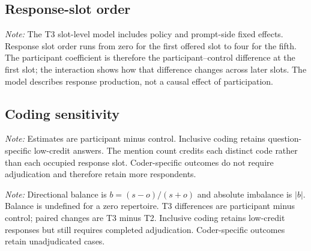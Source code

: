 \documentclass{article}
\begin{document}
\subsection{Response-slot order}

\begin{table}[H]
\centering
\caption{Linear probability model for whether a response slot contains a valid reason}

\begin{minipage}{0.95\textwidth}
\smallskip\footnotesize
\textit{Note:} The T3 slot-level model includes policy and prompt-side fixed effects. Response
slot order runs from zero for the first offered slot to four for the fifth. The participant
coefficient is therefore the participant--control difference at the first slot; the interaction
shows how that difference changes across later slots. The model describes response production,
not a causal effect of participation.
\end{minipage}
\end{table}

\subsection{Coding sensitivity}

\begin{table}[H]
\centering
\caption{Sensitivity of the total-repertoire T3 comparison to coding choices}

\begin{minipage}{0.95\textwidth}
\smallskip\footnotesize
\textit{Note:} Estimates are participant minus control. Inclusive coding retains
question-specific low-credit answers. The mention count credits each distinct code rather than
each occupied response slot. Coder-specific outcomes do not require adjudication and therefore
retain more respondents.
\end{minipage}
\end{table}

\begin{table}[H]
\centering
\small
\caption{Sensitivity of directional balance to coding choices}
\resizebox{\textwidth}{!}{%

}
\begin{minipage}{0.95\textwidth}
\smallskip\footnotesize
\textit{Note:} Directional balance is $b=(s-o)/(s+o)$ and absolute imbalance is $|b|$.
Balance is undefined for a zero repertoire. T3 differences are participant minus control;
paired changes are T3 minus T2. Inclusive coding retains low-credit responses but still
requires completed adjudication. Coder-specific outcomes retain unadjudicated cases.
\end{minipage}
\end{table}
\end{document}
